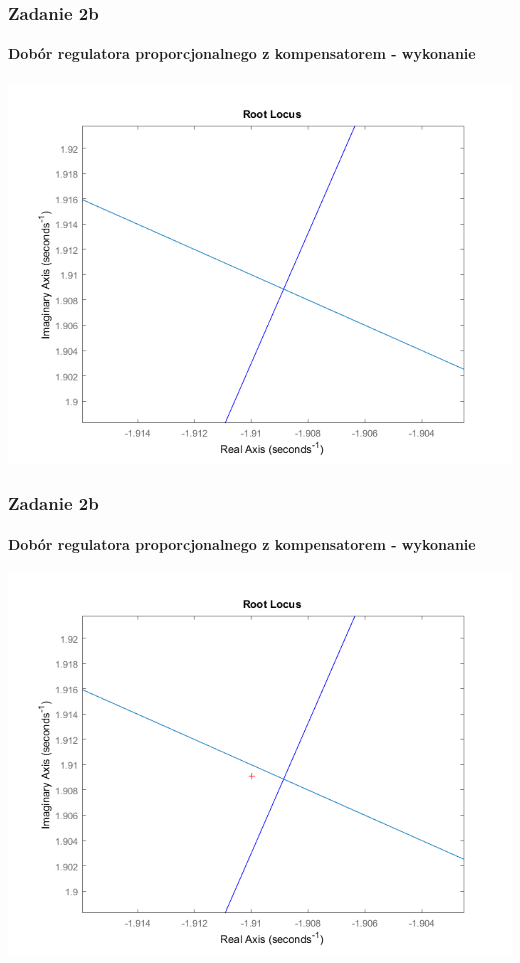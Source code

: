 \documentclass{beamer}
\begin{document}
\begin{frame}\frametitle{Zadanie 2b}\framesubtitle{Dobór regulatora proporcjonalnego z kompensatorem - wykonanie}
\centering	\includegraphics[scale=0.5]{b-przyblizenie.png}
\end{frame}

\begin{frame}\frametitle{Zadanie 2b}\framesubtitle{Dobór regulatora proporcjonalnego z kompensatorem - wykonanie}
\centering	\includegraphics[scale=0.5]{b-rlocfind.png}
\end{frame}
\end{document}
